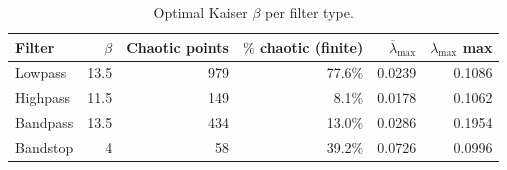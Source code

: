 \begin{table}[htbp]
  \centering
  \caption{Optimal Kaiser $\beta$ per filter type.}
  \begin{tabular}{lrrrrr}
    \toprule
    Filter & $\beta$ & Chaotic points & $\%$ chaotic (finite) & $\overline{\lambda}_{\max}$ & $\lambda_{\max}$ max \\
    \midrule
    Lowpass & 13.5 & 979 & 77.6\% & 0.0239 & 0.1086 \\
    Highpass & 11.5 & 149 & 8.1\% & 0.0178 & 0.1062 \\
    Bandpass & 13.5 & 434 & 13.0\% & 0.0286 & 0.1954 \\
    Bandstop & 4 & 58 & 39.2\% & 0.0726 & 0.0996 \\
    \bottomrule
  \end{tabular}
\end{table}
